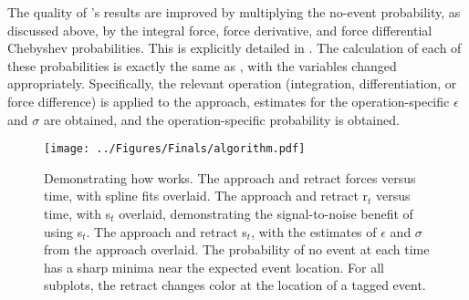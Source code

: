 The quality of \name{}'s results are improved by multiplying the no-event probability, as discussed above, by the integral force, force derivative, and force differential Chebyshev probabilities. This is explicitly detailed in . The calculation of each of these probabilities is exactly the same as , with the variables changed appropriately. Specifically, the relevant operation (integration, differentiation, or force difference) is applied to the approach, estimates for the operation-specific $\epsilon$ and $\sigma$ are obtained, and the operation-specific probability is obtained.


\begin{figure}[htp]
\caption[\name{} algorithmic pipeline]{\noindent{}\pStartF Demonstrating how \name{} works.  The approach and retract forces versus time, with spline fits overlaid.  The approach and retract r$_t$ versus time, with s$_t$ overlaid, demonstrating the signal-to-noise benefit of using s$_t$.  The approach and retract s$_t$, with the estimates of $\epsilon$ and $\sigma$ from the approach overlaid.  The probability of no event at each time has a sharp minima near the expected event location. For all subplots, the retract changes color at the location of a tagged event. \pEndF }
\centering
\texttt{[image: ../Figures/Finals/algorithm.pdf]}%
\end{figure}


